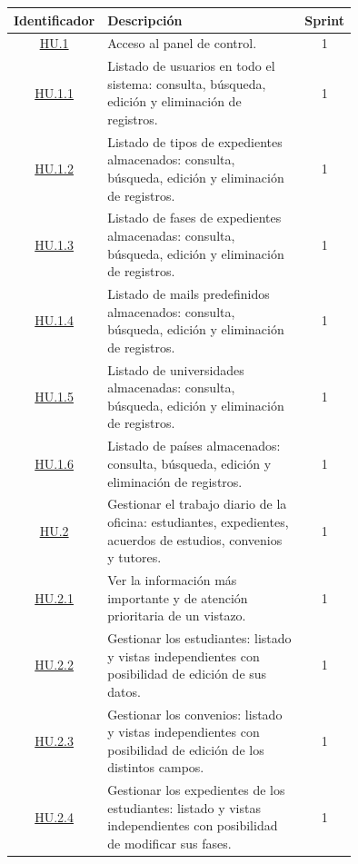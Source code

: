 \begin{table}[h]
	\begin{center}
		\begin{adjustbox}{width=1\textwidth}
			\begin{tabular}{ | c | >{\centering\arraybackslash}p{0.75\linewidth} | c | } 
				\hline
					\textbf{Identificador} & \textbf{Descripción} & \textbf{Sprint} \\
				\hline
					\hyperref[tab:HU1]{HU.1} &  Acceso al panel de control. & 1 \\
				\hline
					\hyperref[tab:HU1.1]{HU.1.1} & Listado de usuarios en todo el sistema: consulta, búsqueda, edición y eliminación de registros. & 1 \\
				\hline
					\hyperref[tab:HU1.2]{HU.1.2} & Listado de tipos de expedientes almacenados: consulta, búsqueda, edición y eliminación de registros. & 1 \\
				\hline
					\hyperref[tab:HU1.3]{HU.1.3} & Listado de fases de expedientes almacenadas: consulta, búsqueda, edición y eliminación de registros. & 1 \\
				\hline
					\hyperref[tab:HU1.4]{HU.1.4} & Listado de mails predefinidos almacenados: consulta, búsqueda, edición y eliminación de registros. & 1 \\
				\hline
					\hyperref[tab:HU1.5]{HU.1.5} & Listado de universidades almacenadas: consulta, búsqueda, edición y eliminación de registros. & 1 \\
				\hline
					\hyperref[tab:HU1.6]{HU.1.6} & Listado de países almacenados: consulta, búsqueda, edición y eliminación de registros. & 1 \\
				\hline
					\hyperref[tab:HU2]{HU.2} & Gestionar el trabajo diario de la oficina: estudiantes, expedientes, acuerdos de estudios, convenios y tutores. & 1 \\
				\hline
					\hyperref[tab:HU2.1]{HU.2.1} & Ver la información más importante y de atención prioritaria de un vistazo. & 1 \\
				\hline
					\hyperref[tab:HU2.2]{HU.2.2} & Gestionar los estudiantes: listado y vistas independientes con posibilidad de edición de sus datos. & 1 \\
				\hline
					\hyperref[tab:HU2.3]{HU.2.3} & Gestionar los convenios: listado y vistas independientes con posibilidad de edición de los distintos campos. & 1 \\
				\hline
					\hyperref[tab:HU2.4]{HU.2.4} & Gestionar los expedientes de los estudiantes: listado y vistas independientes con posibilidad de modificar sus fases. & 1 \\

\end{tabular}
\end{adjustbox}
\end{center}
\end{table}
